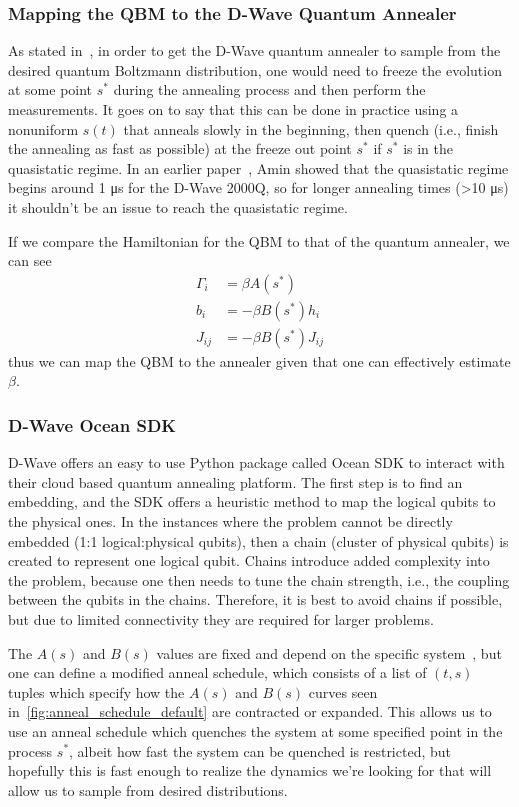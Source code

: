 \subsubsection{Mapping the QBM to the D-Wave Quantum Annealer}
As stated in~\cite{amin_2018}, in order to get the D-Wave quantum annealer to sample from the desired quantum Boltzmann distribution, one would need to freeze the evolution at some point \( s^* \) during the annealing process and then perform the measurements.
It goes on to say that this can be done in practice using a nonuniform \( s(t) \) that anneals slowly in the beginning, then quench (i.e., finish the annealing as fast as possible) at the freeze out point \( s^* \) if \( s^* \) is in the quasistatic regime.
In an earlier paper~\cite{amin_2015}, Amin showed that the quasistatic regime begins around 1 \si{\micro\second} for the D-Wave 2000Q, so for longer annealing times (>10 \si{\micro\second}) it shouldn't be an issue to reach the quasistatic regime.

If we compare the Hamiltonian for the QBM to that of the quantum annealer, we can see
\begin{align}
    \Gamma_i
        &= \beta A(s^*) \\
    b_i
        &= -\beta B(s^*) h_i \\
    J_{ij}
        &= -\beta B(s^*) J_{ij}
\end{align}
thus we can map the QBM to the annealer given that one can effectively estimate \( \beta \).

\subsubsection{D-Wave Ocean SDK}
D-Wave offers an easy to use Python package called Ocean SDK to interact with their cloud based quantum annealing platform.
The first step is to find an embedding, and the SDK offers a heuristic method to map the logical qubits to the physical ones.
In the instances where the problem cannot be directly embedded (1:1 logical:physical qubits), then a chain (cluster of physical qubits) is created to represent one logical qubit.
Chains introduce added complexity into the problem, because one then needs to tune the chain strength, i.e., the coupling between the qubits in the chains.
Therefore, it is best to avoid chains if possible, but due to limited connectivity they are required for larger problems.

The \( A(s) \) and \( B(s) \) values are fixed and depend on the specific system~\cite{dwave_anneal_schedules}, but one can define a modified anneal schedule, which consists of a list of \( (t, s) \) tuples which specify how the \( A(s) \) and \( B(s) \) curves seen in~\cref{fig:anneal_schedule_default} are contracted or expanded.
This allows us to use an anneal schedule which quenches the system at some specified point in the process \( s^* \), albeit how fast the system can be quenched is restricted, but hopefully this is fast enough to realize the dynamics we're looking for that will allow us to sample from desired distributions.

